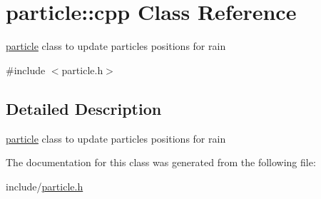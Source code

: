 \hypertarget{classparticle_1_1cpp}{
\section{particle::cpp Class Reference}
\label{classparticle_1_1cpp}
}


\hyperlink{namespaceparticle}{particle} class to update particles positions for rain  


{\ttfamily \#include $<$particle.h$>$}

\subsection{Detailed Description}
\hyperlink{namespaceparticle}{particle} class to update particles positions for rain 

The documentation for this class was generated from the following file:\begin{DoxyCompactItemize}
\item 
include/\hyperlink{particle_8h}{particle.h}\end{DoxyCompactItemize}
